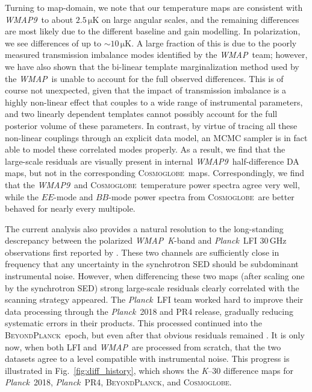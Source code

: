 \documentclass[twocolumn]{../../common/aa}
\def\WMAP{\emph{WMAP}}
\def\WMAPnine{\emph{WMAP9}}
\def\Planck{\emph{Planck}}
\newcommand{\bp}{\textsc{BeyondPlanck}}
\newcommand{\cosmoglobe}{\textsc{Cosmoglobe}}
\newcommand{\K}[0]{\textit K}
\begin{document}
Turning to map-domain, we note that our temperature maps are consistent with \WMAPnine\ to about $2.5\,\mathrm{\mu K}$ on large angular scales, and the remaining differences are most likely due to the different baseline and gain modelling. In polarization, we see differences of up to $\sim10\,\mathrm{\mu K}$. A large fraction of this is due to the poorly measured transmission imbalance modes identified by the \WMAP\ team; however, we have also shown that the bi-linear template marginalization method used by the \WMAP\ is unable to account for the full observed differences. This is of course not unexpected, given that the impact of transmission imbalance is a highly non-linear effect that couples to a wide range of instrumental parameters, and two linearly dependent templates cannot possibly account for the full posterior volume of these parameters. In contrast, by virtue of tracing all these non-linear couplings through an explicit data model, an MCMC sampler is in fact able to model these correlated modes properly. As a result, we find that the large-scale residuals are visually present in internal \WMAPnine\ half-difference DA maps, but not in the corresponding \cosmoglobe\ maps. Correspondingly, we find that the \WMAPnine\ and \cosmoglobe\ temperature power spectra agree very well, while the $EE$-mode and $BB$-mode power spectra from \cosmoglobe\ are better behaved for nearly every multipole.

The current analysis also provides a natural resolution to the long-standing descrepancy between the polarized \WMAP\ \K-band and \Planck\ LFI 30\,GHz observations first reported by \citet{planck2014-a12}. These two channels are sufficiently close in frequency that any uncertainty in the synchrotron SED should be subdominant instrumental noise. However, when differencing these two maps (after scaling one by the synchrotron SED) strong large-scale residuals clearly correlated with the scanning strategy appeared. The \Planck\ LFI team worked hard to improve their data processing through the \Planck\ 2018 and PR4 release, gradually reducing systematic errors in their products. This processed continued into the \bp\ epoch, but even after that obvious residuals remained \citep{bp07}. It is only now, when both LFI and \WMAP\ are processed from scratch, that the two datasets agree to a level compatible with instrumental noise. This progress is illustrated in Fig.~\ref{fig:diff_history}, which shows the \K--30 difference maps for \Planck\ 2018, \Planck\ PR4, \bp, and \cosmoglobe. 
\end{document}
